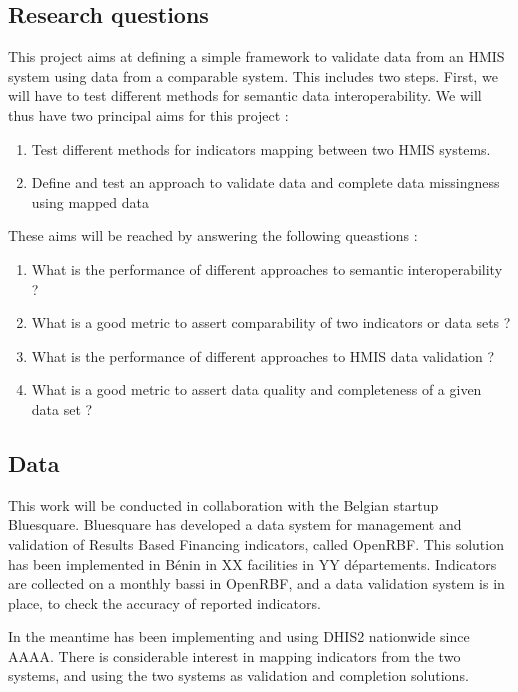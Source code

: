 \subsection{Research questions}

This project aims at defining a simple framework to validate data from an HMIS system using data from a comparable system. This includes two steps. First, we will have to test different methods for semantic data interoperability. We will thus have two principal aims for this project :

\begin{enumerate}
\item Test different methods for indicators mapping between two HMIS systems.
\item Define and test an approach to validate data and complete data missingness using mapped data
\end{enumerate}


These aims will be reached by answering the following queastions :

\begin{enumerate}
\item What is the performance of different approaches to semantic interoperability ?
\item What is a good metric to assert comparability of two indicators or data sets ?
\item What is the performance of different approaches to HMIS data validation ?
\item What is a good metric to assert data quality and completeness of a given data set ?
\end{enumerate}


\subsection{Data}

This work will be conducted in collaboration with the Belgian startup Bluesquare. Bluesquare has developed a data system for management and validation of Results Based Financing indicators, called OpenRBF. This solution has been implemented in Bénin in XX facilities in YY départements. Indicators are collected on a monthly bassi in OpenRBF, and a data validation system is in place, to check the accuracy of reported indicators.

In the meantime has been implementing and using DHIS2 nationwide since AAAA. There is considerable interest in mapping indicators from the two systems, and using the two systems as validation and completion solutions.

